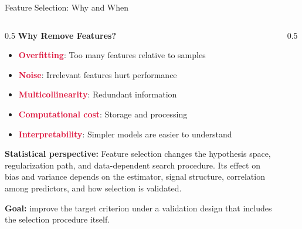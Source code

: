 \documentclass[aspectratio=169,11pt]{beamer}
\begin{document}
\begin{frame}{Feature Selection: Why and When}
\begin{columns}
\begin{column}{0.5\textwidth}
\textbf{Why Remove Features?}

\begin{itemize}
\item \textcolor{crimson}{\textbf{Overfitting}}: Too many features relative to samples
\item \textcolor{crimson}{\textbf{Noise}}: Irrelevant features hurt performance
\item \textcolor{crimson}{\textbf{Multicollinearity}}: Redundant information
\item \textcolor{crimson}{\textbf{Computational cost}}: Storage and processing
\item \textcolor{crimson}{\textbf{Interpretability}}: Simpler models are easier to understand
\end{itemize}

\vspace{0.3cm}
\textbf{Statistical perspective:}
Feature selection changes the hypothesis space, regularization path, and data-dependent search procedure. Its effect on bias and variance depends on the estimator, signal structure, correlation among predictors, and how selection is validated.

\textbf{Goal:} improve the target criterion under a validation design that includes the selection procedure itself.
\end{column}
\begin{column}{0.5\textwidth}
\begin{figure}
\centering
{}
\end{figure}


\end{column}
\end{columns}
\end{frame}
\end{document}
